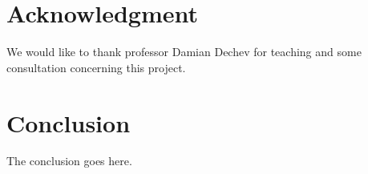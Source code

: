 \documentclass[conference]{IEEEtran}
\begin{document}
\section*{Acknowledgment}
We would like to thank professor Damian Dechev for teaching and some consultation concerning this project.
\section{Conclusion}
The conclusion goes here.
















%


\end{document}
